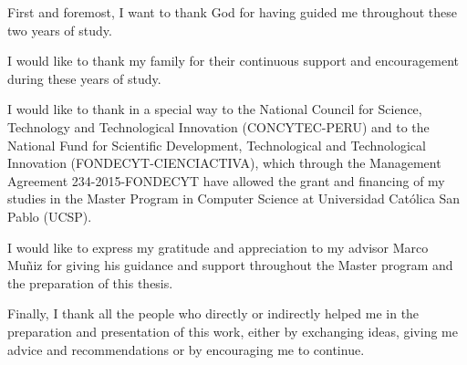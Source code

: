 \begin{agradecimientos}

First and foremost, I want to thank God for having guided me throughout these two years of study.

I would like to thank my family for their continuous support and encouragement during these years of study.

I would like to thank in a special way to the National Council for Science, Technology and Technological Innovation (CONCYTEC-PERU) and to the National Fund for Scientific Development, Technological and Technological Innovation (FONDECYT-CIENCIACTIVA), which through the Management Agreement 234-2015-FONDECYT have allowed the grant and financing of my studies in the Master Program in Computer Science at Universidad Cat\'{o}lica San Pablo (UCSP).

I would like to express my gratitude and appreciation to my advisor Marco Muñiz for giving his guidance and support throughout the Master program and the preparation of this thesis.


Finally, I thank all the people who directly or indirectly helped me in the preparation and presentation of this work, either by exchanging ideas, giving me advice and recommendations or by encouraging me to continue.


\end{agradecimientos}
